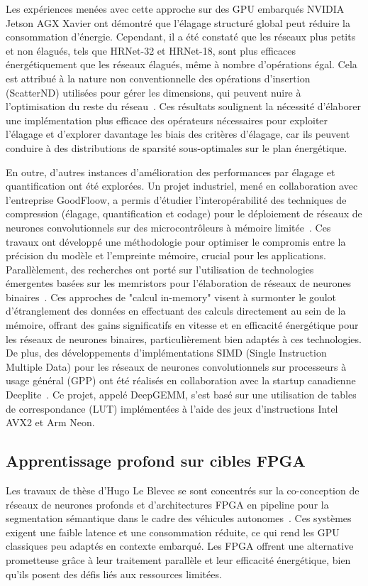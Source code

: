 \documentclass[11pt]{report}
\begin{document}
Les expériences menées avec cette approche sur des GPU embarqués NVIDIA Jetson AGX Xavier ont démontré que l'élagage structuré global peut réduire la consommation d'énergie. Cependant, il a été constaté que les réseaux plus petits et non élagués, tels que HRNet-32 et HRNet-18, sont plus efficaces énergétiquement que les réseaux élagués, même à nombre d'opérations égal. Cela est attribué à la nature non conventionnelle des opérations d'insertion (ScatterND) utilisées pour gérer les dimensions, qui peuvent nuire à l'optimisation du reste du réseau~\cite{tessier:hal-03767634,tessier:hal-03767636}. Ces résultats soulignent la nécessité d'élaborer une implémentation plus efficace des opérateurs nécessaires pour exploiter l'élagage et d'explorer davantage les biais des critères d'élagage, car ils peuvent conduire à des distributions de sparsité sous-optimales sur le plan énergétique.

En outre, d'autres instances d'amélioration des performances par élagage et quantification ont été explorées. Un projet industriel, mené en collaboration avec l'entreprise GoodFloow, a permis d'étudier l'interopérabilité des techniques de compression (élagage, quantification et codage) pour le déploiement de réseaux de neurones convolutionnels sur des microcontrôleurs à mémoire limitée~\cite{younes:hal-03850858}. Ces travaux ont développé une méthodologie pour optimiser le compromis entre la précision du modèle et l'empreinte mémoire, crucial pour les applications. Parallèlement, des recherches ont porté sur l'utilisation de technologies émergentes basées sur les memristors pour l'élaboration de réseaux de neurones binaires~\cite{alhajali:hal-03659297}. Ces approches de "calcul in-memory" visent à surmonter le goulot d'étranglement des données en effectuant des calculs directement au sein de la mémoire, offrant des gains significatifs en vitesse et en efficacité énergétique pour les réseaux de neurones binaires, particulièrement bien adaptés à ces technologies. De plus, des développements d'implémentations SIMD (Single Instruction Multiple Data) pour les réseaux de neurones convolutionnels sur processeurs à usage général (GPP) ont été réalisés en collaboration avec la startup canadienne Deeplite~\cite{ganji:hal-04082069}. Ce projet, appelé DeepGEMM, s'est basé sur une utilisation de tables de correspondance (LUT) implémentées à l'aide des jeux d'instructions Intel AVX2 et Arm Neon.

\subsection{Apprentissage profond sur cibles FPGA}
Les travaux de thèse d'Hugo Le Blevec se sont concentrés sur la co-conception de réseaux de neurones profonds et d'architectures FPGA en pipeline pour la segmentation sémantique dans le cadre des véhicules autonomes~\cite{leblevec:hal-04262138,leblevec:hal-04705594}. Ces systèmes exigent une faible latence et une consommation réduite, ce qui rend les GPU classiques peu adaptés en contexte embarqué. Les FPGA offrent une alternative prometteuse grâce à leur traitement parallèle et leur efficacité énergétique, bien qu'ils posent des défis liés aux ressources limitées.
\end{document}
